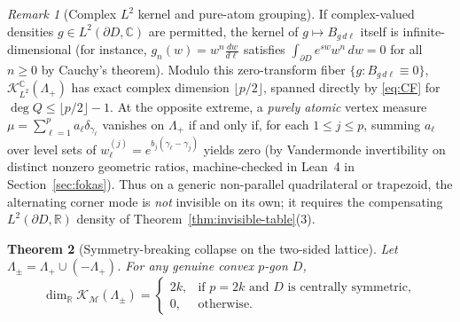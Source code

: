 \documentclass[11pt,reqno]{amsart}
\newtheorem{theorem}{Theorem}[section]
\theoremstyle{definition}
\theoremstyle{remark}
\newtheorem{remark}[theorem]{Remark}
\newcommand{\C}{\mathbb{C}}
\newcommand{\R}{\mathbb{R}}
\begin{document}
\begin{remark}[Complex $L^2$ kernel and pure-atom grouping]\label{rem:pure-atoms}
If complex-valued densities $g \in L^2(\partial D, \C)$ are permitted, the kernel of $g \mapsto B_{g\,d\ell}$ itself is infinite-dimensional (for instance, $g_n(w) = w^n \frac{dw}{d\ell}$ satisfies $\int_{\partial D} e^{sw} w^n\,dw = 0$ for all $n \ge 0$ by Cauchy's theorem). Modulo this zero-transform fiber $\{g : B_{g\,d\ell} \equiv 0\}$, $\mathcal{K}_{L^2}^\C(\Lambda_+)$ has exact complex dimension $\lfloor p/2 \rfloor$, spanned directly by \eqref{eq:CF} for $\deg Q \le \lfloor p/2 \rfloor - 1$. At the opposite extreme, a \emph{purely atomic} vertex measure $\mu = \sum_{\ell=1}^p a_\ell \delta_{\gamma_\ell}$ vanishes on $\Lambda_+$ if and only if, for each $1 \le j \le p$, summing $a_\ell$ over level sets of $w_\ell^{(j)} = e^{b_j(\gamma_\ell - \gamma_j)}$ yields zero (by Vandermonde invertibility on distinct nonzero geometric ratios, machine-checked in Lean~4 in Section~\ref{sec:fokas}). Thus on a generic non-parallel quadrilateral or trapezoid, the alternating corner mode is \emph{not} invisible on its own; it requires the compensating $L^2(\partial D, \R)$ density of Theorem~\ref{thm:invisible-table}(3).
\end{remark}

\begin{theorem}[Symmetry-breaking collapse on the two-sided lattice]\label{thm:two-sided}
Let $\Lambda_\pm = \Lambda_+ \cup (-\Lambda_+)$. For any genuine convex $p$-gon $D$,
\[
  \dim_\R \mathcal{K}_{\mathcal{M}}(\Lambda_\pm) =
  \begin{cases}
    2k, & \text{if } p = 2k \text{ and } D \text{ is centrally symmetric},\\
    0, & \text{otherwise}.
  \end{cases}
\]
\end{theorem}
\end{document}
